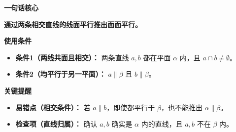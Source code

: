 \begin{summarybox}
	\textbf{\textcolor{CSummary}{一句话核心}}

	\textbf{通过两条相交直线的线面平行推出面面平行。}

	\medskip
	\textbf{\textcolor{CSummary}{使用条件}}
	\begin{itemize}[leftmargin=*, itemsep=0.5em, topsep=0.4em]
		\item \textbf{条件1（两线共面且相交）：} 两条直线 $a,b$ 都在平面 $\alpha$ 内，且 $a\cap b\neq\emptyset$。
		\item \textbf{条件2（均平行于另一平面）：} $a\parallel\beta$ 且 $b\parallel\beta$。
	\end{itemize}

	\medskip
	\textbf{\textcolor{CSummary}{关键提醒}}
	\begin{itemize}[leftmargin=*, itemsep=0.5em, topsep=0.4em]
		\item \textbf{易错点（相交条件）：} 若 $a\parallel b$，即使都平行于 $\beta$，也不能推出 $\alpha\parallel\beta$。
		\item \textbf{检查项（直线归属）：} 确认 $a,b$ 确实是 $\alpha$ 内的直线，且 $a,b$ 不在 $\beta$ 内。
	\end{itemize}
\end{summarybox}

